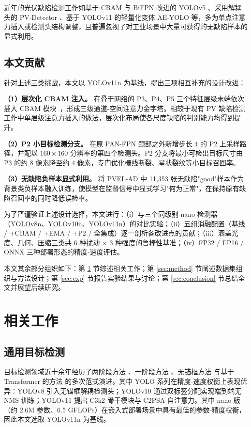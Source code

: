 \documentclass[journal,onecolumn,11pt]{IEEEtran}
\begin{document}
近年的光伏缺陷检测工作如基于 CBAM 与 BiFPN 改进的 YOLOv5 \cite{wang2023yolo5pv}、采用解耦头的 PV-Detector \cite{liu2024pvdetector}、基于 YOLOv11 的轻量化变体 AE-YOLO \cite{aeyolo2025} 等，多为单点注意力插入或检测头结构调整，且普遍忽视了对工业场景中大量可获得的无缺陷样本的显式利用。

\subsection{本文贡献}
\label{sec:contrib}
针对上述三类挑战，本文以 YOLOv11n 为基线，提出三项相互补充的设计改进：

\textbf{（1）层次化 CBAM 注入。} 在骨干网络的 P3、P4、P5 三个特征层级末端依次插入 CBAM 模块~\cite{woo2018cbam}，形成三级通道-空间注意力金字塔。相较于现有 PV 缺陷检测工作中单层级注意力插入的做法，层次化布局使各尺度缺陷的判别能力均得到提升。

\textbf{（2）P2 小目标检测分支。} 在原 PAN-FPN 颈部之外新增步长 4 的 P2 上采样路径，并配以 $160\times160$ 分辨率的第四个检测头。P2 分支将最小可检出目标尺寸由 P3 的约 8 像素降至约 4 像素，专门优化栅线断裂、星状裂纹等小目标召回率。

\textbf{（3）无缺陷负样本显式利用。} 将 PVEL-AD 中 11{,}353 张无缺陷"good"样本作为背景类负样本融入训练，使模型在监督信号中显式学习"何为正常"，在保持原有缺陷召回率的同时降低误检率。

为了严谨验证上述设计选择，本文进行：（i）与三个同级别 nano 检测器（YOLOv8n、YOLOv10n、YOLOv11n）的对比实验；（ii）五组消融配置（基线 / +CBAM / +EMA / +P2 / 全集成）逐一剖析各改进点的贡献；（iii）涵盖光度、几何、压缩三类共 6 种扰动 $\times$ 3 种强度的鲁棒性基准；（iv）FP32 / FP16 / ONNX 三种部署形态的精度-速度评估。

本文其余部分组织如下：第 \ref{sec:related} 节综述相关工作；第 \ref{sec:method} 节阐述数据集组织与方法设计；第 \ref{sec:exp} 节报告实验结果与讨论；第 \ref{sec:conclusion} 节总结全文并展望后续研究。

\section{相关工作}
\label{sec:related}

\subsection{通用目标检测}
目标检测领域近十余年经历了两阶段方法 \cite{ren2017fasterrcnn}、一阶段方法 \cite{redmon2016yolo,liu2016ssd}、无锚框方法 \cite{tian2019fcos} 与基于 Transformer 的方法 \cite{carion2020detr,zhao2024rtdetr} 的多次范式演进。其中 YOLO 系列在精度-速度权衡上表现优异：YOLOv8 \cite{jocher2023yolov8} 引入无锚框解耦检测头；YOLOv10 \cite{wang2024yolov10} 通过双标签分配实现端到端无 NMS 训练；YOLOv11 \cite{jocher2024yolo11} 提出 C3k2 骨干模块与 C2PSA 自注意力。其中 nano 版（约 2.6M 参数、6.5 GFLOPs）在嵌入式部署场景中具有最佳的参数-精度权衡，因此本文选取 YOLOv11n 为基线。
\end{document}
